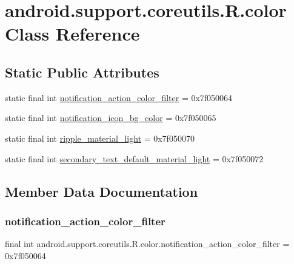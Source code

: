 \hypertarget{classandroid_1_1support_1_1coreutils_1_1R_1_1color}{}\section{android.\+support.\+coreutils.\+R.\+color Class Reference}
\label{classandroid_1_1support_1_1coreutils_1_1R_1_1color}
\subsection*{Static Public Attributes}
\begin{DoxyCompactItemize}
\item 
static final int \mbox{\hyperlink{classandroid_1_1support_1_1coreutils_1_1R_1_1color_a7a57235ba2f01f2a77766f32f9505593}{notification\+\_\+action\+\_\+color\+\_\+filter}} = 0x7f050064
\item 
static final int \mbox{\hyperlink{classandroid_1_1support_1_1coreutils_1_1R_1_1color_a870ee184f70eb0ba5f8b597bb81ef1e4}{notification\+\_\+icon\+\_\+bg\+\_\+color}} = 0x7f050065
\item 
static final int \mbox{\hyperlink{classandroid_1_1support_1_1coreutils_1_1R_1_1color_a2bb831d5cf5464fbe7a270446353ed6f}{ripple\+\_\+material\+\_\+light}} = 0x7f050070
\item 
static final int \mbox{\hyperlink{classandroid_1_1support_1_1coreutils_1_1R_1_1color_aae8ae33c65014cccc6bfd139de0c1990}{secondary\+\_\+text\+\_\+default\+\_\+material\+\_\+light}} = 0x7f050072
\end{DoxyCompactItemize}


\subsection{Member Data Documentation}
\mbox{\label{classandroid_1_1support_1_1coreutils_1_1R_1_1color_a7a57235ba2f01f2a77766f32f9505593}} 
\subsubsection{\texorpdfstring{notification\+\_\+action\+\_\+color\+\_\+filter}{notification\_action\_color\_filter}}
{\footnotesize\ttfamily final int android.\+support.\+coreutils.\+R.\+color.\+notification\+\_\+action\+\_\+color\+\_\+filter = 0x7f050064\hspace{0.3cm}{\ttfamily [static]}}

